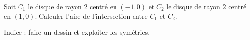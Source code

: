 \begin{exercice}\label{exoGeomAnal-0050}

     Soit \( C_1\) le disque de rayon \( 2\) centré en \( (-1,0)\) et \( C_2\) le disque de rayon \( 2\) centré en \( (1,0)\). Calculer l'aire de l'intersection entre \( C_1\) et \( C_2\).

            Indice : faire un dessin et exploiter les symétries.

\end{exercice}
